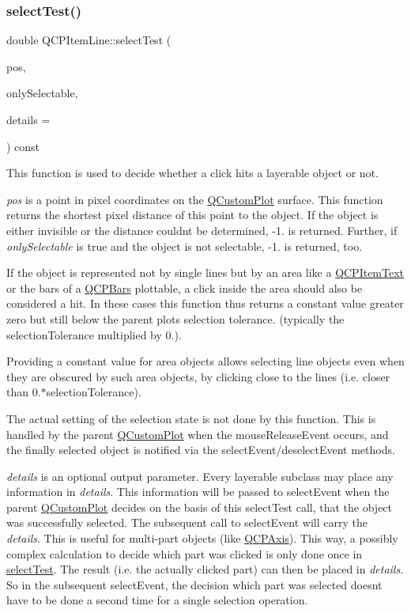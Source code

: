 \subsubsection{\texorpdfstring{select\+Test()}{selectTest()}}
{\footnotesize\ttfamily double Q\+C\+P\+Item\+Line\+::select\+Test (\begin{DoxyParamCaption}\item[{const Q\+PointF \&}]{pos,  }\item[{bool}]{only\+Selectable,  }\item[{Q\+Variant $\ast$}]{details = {} }\end{DoxyParamCaption}) const\hspace{0.3cm}{\ttfamily [virtual]}}

This function is used to decide whether a click hits a layerable object or not.

{\itshape pos} is a point in pixel coordinates on the \hyperlink{classQCustomPlot}{Q\+Custom\+Plot} surface. This function returns the shortest pixel distance of this point to the object. If the object is either invisible or the distance couldn\textquotesingle{}t be determined, -\/1. is returned. Further, if {\itshape only\+Selectable} is true and the object is not selectable, -\/1. is returned, too.

If the object is represented not by single lines but by an area like a \hyperlink{classQCPItemText}{Q\+C\+P\+Item\+Text} or the bars of a \hyperlink{classQCPBars}{Q\+C\+P\+Bars} plottable, a click inside the area should also be considered a hit. In these cases this function thus returns a constant value greater zero but still below the parent plot\textquotesingle{}s selection tolerance. (typically the selection\+Tolerance multiplied by 0.).

Providing a constant value for area objects allows selecting line objects even when they are obscured by such area objects, by clicking close to the lines (i.\+e. closer than 0.$\ast$selection\+Tolerance).

The actual setting of the selection state is not done by this function. This is handled by the parent \hyperlink{classQCustomPlot}{Q\+Custom\+Plot} when the mouse\+Release\+Event occurs, and the finally selected object is notified via the select\+Event/deselect\+Event methods.

{\itshape details} is an optional output parameter. Every layerable subclass may place any information in {\itshape details}. This information will be passed to select\+Event when the parent \hyperlink{classQCustomPlot}{Q\+Custom\+Plot} decides on the basis of this select\+Test call, that the object was successfully selected. The subsequent call to select\+Event will carry the {\itshape details}. This is useful for multi-\/part objects (like \hyperlink{classQCPAxis}{Q\+C\+P\+Axis}). This way, a possibly complex calculation to decide which part was clicked is only done once in \hyperlink{classQCPItemLine_a8e02bfbca04fbcf3dbc375a2bf693229}{select\+Test}. The result (i.\+e. the actually clicked part) can then be placed in {\itshape details}. So in the subsequent select\+Event, the decision which part was selected doesn\textquotesingle{}t have to be done a second time for a single selection operation.

